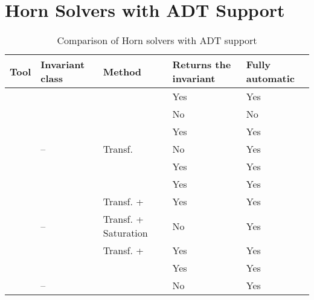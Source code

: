 \section{Horn Solvers with ADT Support}\label{sec:relatedWork/hornSolvers}

\begin{table} [htbp]
    \centering
    \begin{threeparttable}%
        \caption{Comparison of Horn solvers with ADT support}\label{tab:hornSolvers}%
        \begin{tabular}{| m{41mm} || x{29mm} | x{28mm} | x{27mm} | x{26mm} |}
            \hline
            \hline
Tool & Invariant class & Method & Returns the invariant & Fully automatic\\\hline\hline
\spacer{} & \elemclass{} & \pdr{} & Yes & Yes\\
\racer{} & \catelemclass{} & \pdr{} & No & No\\
\eldarica{} & \sizeelemclass{} & \cegar{} & Yes & Yes\\
\vericat{} & -- & Transf. & No & Yes\\
\hoice{} & \elemclass{} & \ice{} & Yes & Yes\\
\rchc{}  & \syncRegFlatClass{} & \ice{} & Yes & Yes\\\hline
\ringenShort{\cvc} & \regclass{} & Transf. + \fmf{} & Yes & Yes\\
\ringenShort{\vampire} & -- & Transf. + Saturation & No & Yes\\
\ringenSyncShort{} & \syncRegFullClass{} & Transf. + \fmf{} & Yes & Yes\\
\ringenCICIShort{\cvc} & \regelemclass{} & \ourCEGAR{} & Yes & Yes\\
\ringenCICIShort{\vampire} & -- & \ourCEGAR{} & No & Yes\\
            \hline
            \hline
        \end{tabular}
    \end{threeparttable}
\end{table}

